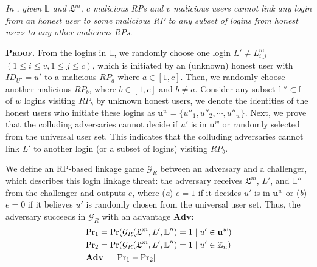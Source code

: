 \begin{thm}[RP Unlinkability]
\emph{In \usso, given $\mathbb{L}$ and $\mathfrak{L}^m$, $c$ malicious RPs and $v$ malicious users cannot link any login from an honest user to some malicious RP to any subset of logins from honest users to any other malicious RPs.}\label{thm-rp-unlinkability}
\end{thm}
\vspace{-1.2mm}

\noindent\textbf{\textsc{Proof.}} From the logins in $\mathbb{L}$,
 we randomly choose one login $L' \neq L^m_{i,j}$ $(1 \le i \le v, 1 \le j \le c)$,
 which is initiated by an (unknown) honest user with $ID_{U'}=u'$ to a malicious $RP_{a}$ where $a \in [1,c]$.
Then, we randomly choose another malicious $RP_{b}$, where $b \in [1,c]$ and $b \neq a$.
Consider any subset $\mathbb{L}'' \subset \mathbb{L}$ of $w$ logins visiting $RP_{b}$ by unknown honest users,
 we denote the identities of the honest users who initiate these logins as $\mathbf{u}^w=\{{u''_1}, {u''_2}, \cdots, {u''_w}\}$.
Next, we prove that the colluding adversaries cannot decide if $u'$ is in $\mathbf{u}^w$ or randomly selected from the universal user set.
This indicates that the colluding adversaries cannot link $L'$ to another login (or a subset of logins) visiting $RP_{b}$.


We define an RP-based linkage game $\mathcal{G}_R$ between an adversary and a challenger, which describes this login linkage threat: the adversary receives $\mathfrak{L}^m$, $L'$, and $\mathbb{L}''$ from the challenger and outputs $e$, where (\emph{a}) $e = 1$ if it decides $u'$ is in $\mathbf{u}^w$ %
or (\emph{b}) $e=0$ if it believes $u'$ is randomly chosen from the universal user set.
Thus, the adversary succeeds in $\mathcal{G}_R$ with an advantage $\mathbf{Adv}$:
\begin{align*}
&{\rm Pr}_1={\rm Pr}(\mathcal{G}_R(\mathfrak{L}^m, L', \mathbb{L}'')=1 \;| \; u' \in \mathbf{u}^w)  \\
&{\rm Pr}_2={\rm Pr}(\mathcal{G}_R(\mathfrak{L}^m, L', \mathbb{L}'')=1 \; | \; u' \in \mathbb{Z}_n)\\
&{\mathbf{Adv}}=|{\rm Pr}_1-{\rm Pr}_2|
\end{align*}

